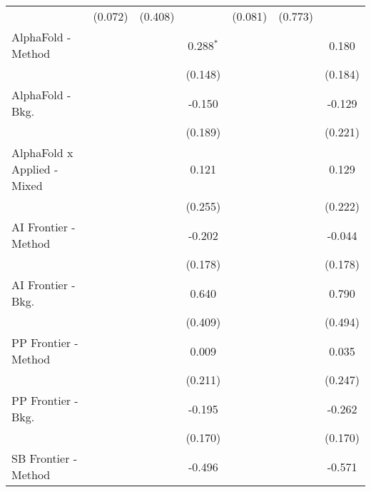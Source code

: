 \begin{tabular}{lcccccc}
                                  & (0.072)      & (0.408)      &               & (0.081)     & (0.773)      &   \\   
   AlphaFold - Method             &              &              & 0.288$^{*}$   &             &              & 0.180\\   
                                  &              &              & (0.148)       &             &              & (0.184)\\   
   AlphaFold - Bkg.               &              &              & -0.150        &             &              & -0.129\\   
                                  &              &              & (0.189)       &             &              & (0.221)\\   
   AlphaFold x Applied - Mixed    &              &              & 0.121         &             &              & 0.129\\   
                                  &              &              & (0.255)       &             &              & (0.222)\\   
   AI Frontier - Method           &              &              & -0.202        &             &              & -0.044\\   
                                  &              &              & (0.178)       &             &              & (0.178)\\   
   AI Frontier - Bkg.             &              &              & 0.640         &             &              & 0.790\\   
                                  &              &              & (0.409)       &             &              & (0.494)\\   
   PP Frontier - Method           &              &              & 0.009         &             &              & 0.035\\   
                                  &              &              & (0.211)       &             &              & (0.247)\\   
   PP Frontier - Bkg.             &              &              & -0.195        &             &              & -0.262\\   
                                  &              &              & (0.170)       &             &              & (0.170)\\   
   SB Frontier - Method           &              &              & -0.496        &             &              & -0.571\\   

\end{tabular}
